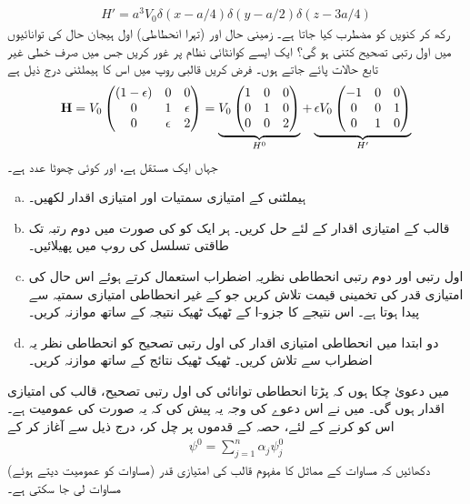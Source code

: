 \begin{align*}
H' = a^3 V_0 \delta (x - a/4) \delta (y - a/2) \delta (z - 3a/4)
\end{align*}
 رکھ کر کنویں کو مضطرب کیا جاتا ہے۔ زمینی حال اور (تہرا انحطاطی) اول ہیجان حال کی توانائیوں میں اول رتبی تصحیح کتنی ہو گی؟
ایک ایسے کوانٹائی نظام پر غور کریں جس میں صرف  خطی غیر تابع حالات پائے جاتے ہوں۔ فرض کریں قالبی روپ میں اس کا ہیملٹنی درج ذیل ہے
\begin{align*}
\operatorname{\mathbf{H}} = V_0 
\begin{pmatrix}
(1 - \epsilon) & 0 & 0 \\
0 & 1 & \epsilon \\
0 & \epsilon & 2
\end{pmatrix}
= \underbrace{V_0 
\begin{pmatrix}
1 & 0 & 0 \\
0 & 1 & 0 \\
0 & 0 & 2
\end{pmatrix}}_{H^0} 
+ \underbrace{\epsilon V_0 
\begin{pmatrix}
-1 & 0 & 0 \\
0 & 0 & 1 \\
0 & 1 & 0
\end{pmatrix}}_{H'}
\end{align*}
جہاں  ایک مستقل ہے، اور  کوئی چھوٹا عدد  ہے۔
\begin{enumerate}[a.]
\item
{} ہیملٹنی  کے امتیازی سمتیات اور امتیازی اقدار لکھیں۔
\item
قالب  کے  امتیازی اقدار کے لئے حل کریں۔ ہر ایک کو  کی صورت میں دوم رتبہ تک طاقتی تسلسل کی روپ میں پھیلائیں۔ 
\item
اول رتبی اور دوم رتبی  انحطاطی نظریہ اضطراب استعمال کرتے ہوئے اس حال کی امتیازی قدر کی تخمینی قیمت تلاش کریں جو  کے غیر انحطاطی امتیازی سمتیہ سے پیدا ہوتا ہے۔ اس نتیجے کا جزو-ا کے ٹھیک ٹھیک نتیجہ کے ساتھ موازنہ کریں۔
\item
دو ابتدا میں انحطاطی امتیازی اقدار کی اول رتبی تصحیح کو انحطاطی نظر یہ اضطراب سے تلاش کریں۔ ٹھیک ٹھیک نتائج کے ساتھ موازنہ کریں۔ 
\end{enumerate}
میں دعویٰ چکا ہوں کہ  پڑتا انحطاطی توانائی کی اول رتبی تصحیح، قالب  کی امتیازی اقدار ہوں گی۔ میں نے اس دعوے کی وجہ یہ پیش کی کہ یہ  صورت کی  عمومیت ہے۔ اس کو  کرنے کے لئے، حصہ  کے قدموں پر چل کر، درج ذیل سے آغاز کر کے
\begin{align*}
\psi^0 = \sum_{j = 1}^n \alpha_j \psi_j^0
\end{align*}
(مساوات  کو عمومیت دیتے ہوئے) دکھائیں کہ مساوات  کے مماثل کا مفہوم قالب  کی امتیازی قدر مساوات لی جا سکتی ہے۔ 

